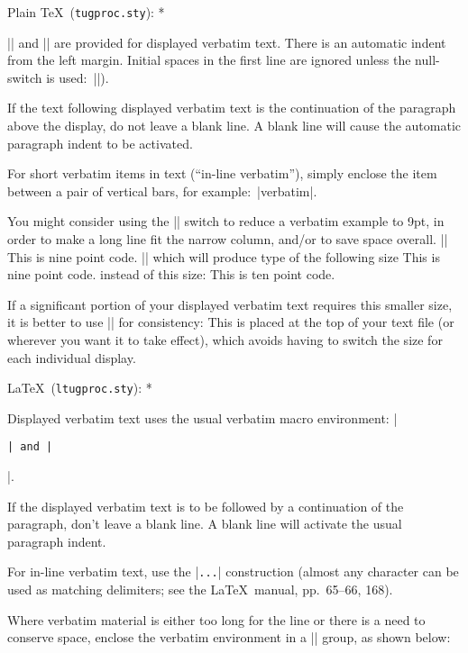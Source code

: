 \subsubhead * Plain \TeX\ ({\tt tugproc.sty}): *
 
|\verbatim| and |\endverbatim| are provided for displayed verbatim text.
There is an automatic indent from the left margin.  Initial spaces in
the first line are ignored unless the null-switch is used:\
|\verbatim[]|).
 
If the text following displayed verbatim text is the continuation of the
paragraph above the display, do not leave a blank line.  A blank line
will cause the automatic paragraph indent to be activated.
 
For short verbatim items in text (``in-line verbatim''), simply enclose
the item between a pair of vertical bars, for example:\
\verbatim[\inline]|verbatim|\endverbatim.
 
You might consider using the |\smallcode| switch to reduce a verbatim
example to 9pt, in order to make a long line fit the narrow column,
and/or to save space overall.\endgraf
||
\verbatim[\smallcode]
This is nine point code.
\endverbatim
||
which will produce type of the following size
\verbatim[\smallcode]
This is nine point code.
\endverbatim
instead of this size:
\verbatim
This is ten point code.
\endverbatim
 
If a significant portion of your displayed verbatim text requires this
smaller size, it is better to use |\everyverbatim| for consistency:\endgraf
\verbatim[\smallcode]
\everyverbatim{\displaystyle{\smallcode}}
\endverbatim
This is placed at the top of your text file (or wherever you want it to
take effect), which avoids having to switch the size for each individual
display.
 
\subsubhead * \LaTeX\ ({\tt ltugproc.sty}): *
 
Displayed verbatim text uses the usual verbatim macro environment:
|\begin{verbatim}| and |\end{verbatim}|.
 
If the displayed verbatim text is to be followed by a continuation of the
paragraph, don't leave a blank line.  A blank line will activate the
usual paragraph indent.
 
For in-line verbatim text, use the |\verb+...+| construction (almost any
character can be used as matching delimiters; see the \LaTeX\ manual,
pp.\ 65--66, 168).
 
Where verbatim material is either too long for the line or there is a
need to conserve space, enclose the verbatim environment in a |\small|
group, as shown below:
 
